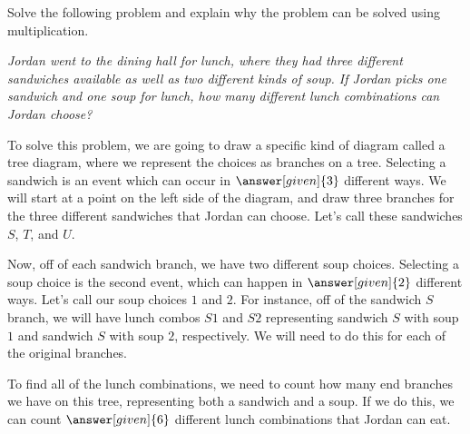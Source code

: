\documentclass{ximera}
\begin{document}
\begin{example}
Solve the following problem and explain why the problem can be solved using multiplication.

\emph{Jordan went to the dining hall for lunch, where they had three different sandwiches available as well as two different kinds of soup. If Jordan picks one sandwich and one soup for lunch, how many different lunch combinations can Jordan choose?}

To solve this problem, we are going to draw a specific kind of diagram called a tree diagram, where we represent the choices as branches on a tree. Selecting a sandwich is an event which can occur in $\answer[given]{3}$ different ways. We will start at a point on the left side of the diagram, and draw three branches for the three different sandwiches that Jordan can choose. Let's call these sandwiches $S$, $T$, and $U$.
\begin{image}
\end{image}
Now, off of each sandwich branch, we have two different soup choices. Selecting a soup choice is the second event, which can happen in $\answer[given]{2}$ different ways. Let's call our soup choices $1$ and $2$. For instance, off of the sandwich $S$ branch, we will have lunch combos $S1$ and $S2$ representing sandwich $S$ with soup $1$ and sandwich $S$ with soup $2$, respectively. We will need to do this for each of the original branches.

\begin{image}
\end{image}
To find all of the lunch combinations, we need to count how many end branches we have on this tree, representing both a sandwich and a soup. If we do this, we can count $\answer[given]{6}$ different lunch combinations that Jordan can eat.


\end{example}
\end{document}
